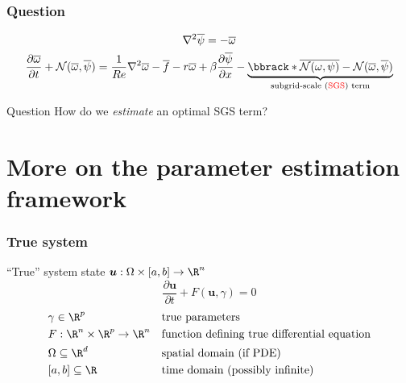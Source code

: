 \documentclass{beamer}
\newcommand{\bu}{\boldsymbol u}
\newcommand{\ol}{\overline}
\begin{document}
\begin{frame}
  \frametitle{Question}

  \textcolor{gray}{
    \begin{equation*}
      \begin{gathered}
        \nabla^2 \ol \psi = - \ol \omega \\
        \frac{\partial \ol \omega}{\partial t} + \mathcal N(\ol \omega, \ol \psi)
        = \frac1{Re} \nabla^2 \ol \omega - \ol f - r \ol \omega
        + \beta \frac{\partial \ol \psi}{\partial x}
        - \underbrace{
          \bbrack*{\ol{\mathcal N(\omega, \psi)}
          - \mathcal N(\ol \omega, \ol \psi)}
        }_{\text{subgrid-scale (} \textcolor{red}{\text{SGS}} \text{) term}}
      \end{gathered}
    \end{equation*}
  }

  \begin{block}{Question}
    How do we \textit{estimate} an optimal SGS term?
  \end{block}
\end{frame}

\section{More on the parameter estimation framework}

\begin{frame}
  \frametitle{True system}
  ``True'' system state $\bu: \Omega \times [a, b] \rightarrow \R^n$
  \begin{equation*}
    \frac{\partial \bu}{\partial t} + F(\bu, \gamma) = 0
  \end{equation*}
  \begin{align*}
    &\gamma \in \R^p &&\text{true parameters} \\
    &F: \R^n \times \R^p \rightarrow \R^n &&\text{function defining true
    differential equation} \\
    &\Omega \subseteq \R^d &&\text{spatial domain (if PDE)} \\
    &[a, b] \subseteq \R &&\text{time domain (possibly infinite)}
  \end{align*}
\end{frame}
\end{document}
